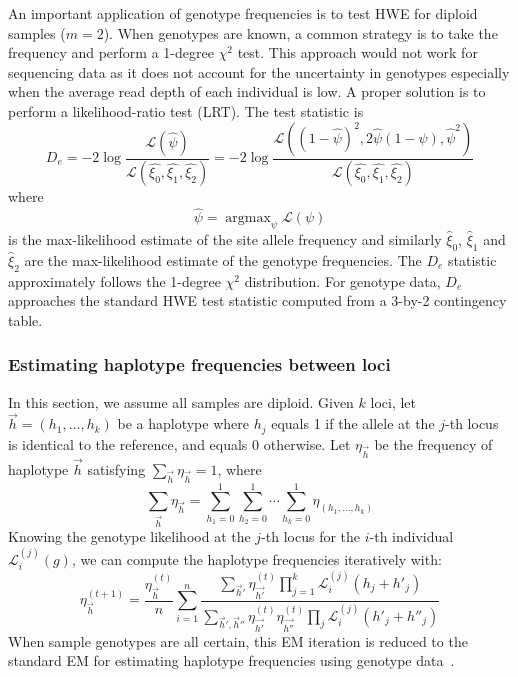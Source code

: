 \documentclass{bioinfo}
\DeclareMathOperator*{\argmax}{argmax}
\begin{document}
\begin{methods}
An important application of genotype frequencies is to test HWE
for diploid samples ($m=2$).  When genotypes are known, a common strategy is to
take the frequency and perform a 1-degree $\chi^2$ test. This approach would
not work for sequencing data as it does not account for the uncertainty in
genotypes especially when the average read depth of each individual is low. A
proper solution is to perform a likelihood-ratio test (LRT). The test statistic is
\begin{equation}\label{eq:hwe}
D_e=-2\log\frac{\mathcal{L}(\hat{\psi})}{\mathcal{L}(\hat{\xi_0},\hat{\xi_1},\hat{\xi_2})}
=-2\log\frac{\mathcal{L}((1-\hat{\psi})^2,2\hat{\psi}(1-\psi),\hat{\psi}^2)}{\mathcal{L}(\hat{\xi_0},\hat{\xi_1},\hat{\xi_2})}
\end{equation}
where
\begin{equation}\label{eq:psimax}
\hat{\psi}=\argmax_{\psi}\mathcal{L}(\psi)
\end{equation}
is the max-likelihood estimate of the site allele frequency and similarly
$\hat{\xi}_0$, $\hat{\xi}_1$ and $\hat{\xi}_2$ are the max-likelihood estimate
of the genotype frequencies. The $D_e$ statistic approximately follows the
1-degree $\chi^2$ distribution. For genotype data, $D_e$ approaches the standard
HWE test statistic computed from a 3-by-2 contingency table.

\subsubsection{Estimating haplotype frequencies between loci}
In this section, we assume all samples are diploid. Given $k$ loci, let
$\vec{h}=(h_1,\ldots,h_k)$ be a haplotype where $h_j$ equals 1 if the allele at
the $j$-th locus is identical to the reference, and equals 0 otherwise.  Let
$\eta_{\vec{h}}$ be the frequency of haplotype $\vec{h}$ satisfying
$\sum_{\vec{h}}\eta_{\vec{h}}=1$, where
$$
\sum_{\vec{h}}\eta_{\vec{h}}=\sum_{h_1=0}^1\sum_{h_2=0}^1\cdots\sum_{h_k=0}^1\eta_{(h_1,\ldots,h_k)}
$$
Knowing the genotype likelihood at the $j$-th locus for the $i$-th individual
$\mathcal{L}^{(j)}_i(g)$, we can compute the haplotype frequencies iteratively
with:
\begin{equation}\label{equ:hf}
\eta^{(t+1)}_{\vec{h}}=\frac{\eta_{\vec{h}}^{(t)}}{n}\sum_{i=1}^n\frac{\sum_{\vec{h}'}\eta_{\vec{h'}}^{(t)}\prod_{j=1}^k\mathcal{L}^{(j)}_i(h_j+h'_j)}
{\sum_{\vec{h}',\vec{h}''}\eta_{\vec{h'}}^{(t)}\eta_{\vec{h''}}^{(t)}\prod_{j}\mathcal{L}^{(j)}_i(h'_j+h''_j)}
\end{equation}
When sample genotypes are all certain, this EM iteration is reduced to the
standard EM for estimating haplotype frequencies using genotype
data~\citep{Excoffier:1995ly}.


\end{methods}
\end{document}

